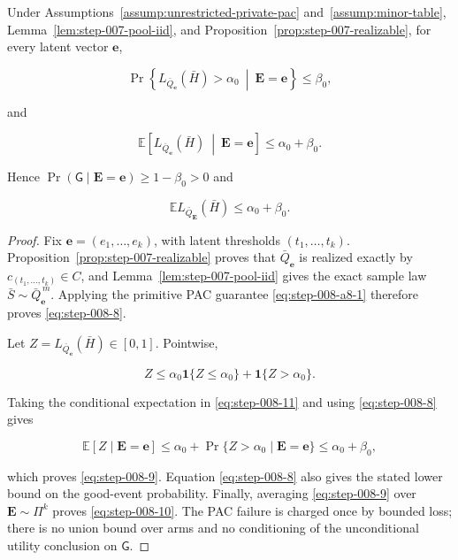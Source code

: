 \begin{proposition}
\label{prop:step-008-pac-expectation}

Under Assumptions~\ref{assump:unrestricted-private-pac}
and~\ref{assump:minor-table}, 
Lemma~\ref{lem:step-007-pool-iid}, and 
Proposition~\ref{prop:step-007-realizable}, for every latent vector
\(\mathbf e\),

\[
\Pr\!\left\{
L_{\bar Q_{\mathbf e}}(\bar H)>\alpha_0
\ \middle|\ \mathbf E=\mathbf e
\right\}
\le\beta_0,
\tag{8}\label{eq:step-008-8}
\]

and

\[
\mathbb E\!\left[
L_{\bar Q_{\mathbf e}}(\bar H)
\ \middle|\ \mathbf E=\mathbf e
\right]
\le\alpha_0+\beta_0.
\tag{9}\label{eq:step-008-9}
\]

Hence \(\Pr(\mathsf G\mid\mathbf E=\mathbf e)\ge1-\beta_0>0\) and

\[
\mathbb E L_{\bar Q_{\mathbf E}}(\bar H)
\le\alpha_0+\beta_0.
\tag{10}\label{eq:step-008-10}
\]

\end{proposition}

\begin{proof}

Fix \(\mathbf e=(e_1,\ldots,e_k)\), with latent thresholds
\((t_1,\ldots,t_k)\).  
Proposition~\ref{prop:step-007-realizable} proves that
\(\bar Q_{\mathbf e}\) is realized exactly by
\(c_{(t_1,\ldots,t_k)}\in C\), and 
Lemma~\ref{lem:step-007-pool-iid} gives the exact sample law
\(\bar S\sim\bar Q_{\mathbf e}^{\,m}\).  Applying the primitive PAC
guarantee \eqref{eq:step-008-a8-1} therefore proves \eqref{eq:step-008-8}.

Let
\(Z=L_{\bar Q_{\mathbf e}}(\bar H)\in[0,1]\).  Pointwise,

\[
Z
\le
\alpha_0\mathbf1\{Z\le\alpha_0\}
+\mathbf1\{Z>\alpha_0\}.
\tag{11}\label{eq:step-008-11}
\]

Taking the conditional expectation in \eqref{eq:step-008-11} and using \eqref{eq:step-008-8} gives

\[
\mathbb E[Z\mid\mathbf E=\mathbf e]
\le\alpha_0+\Pr\{Z>\alpha_0\mid\mathbf E=\mathbf e\}
\le\alpha_0+\beta_0,
\tag{12}\label{eq:step-008-12}
\]

which proves \eqref{eq:step-008-9}.  Equation \eqref{eq:step-008-8} also gives the stated lower bound on
the good-event probability.  Finally, averaging \eqref{eq:step-008-9} over
\(\mathbf E\sim\Pi^k\) proves \eqref{eq:step-008-10}.  The PAC failure is charged once
by bounded loss; there is no union bound over arms and no conditioning
of the unconditional utility conclusion on \(\mathsf G\).

\end{proof}


